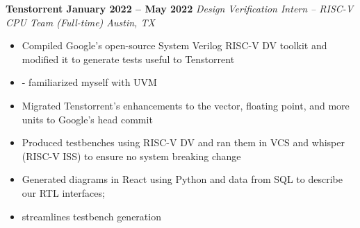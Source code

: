 \documentclass[../main.tex]{subfiles}
\begin{document}
%
\noindent\textbf{{\fontsize{\textFontSize}{\textFontBox}\selectfont Tenstorrent \hfill January 2022 – May 2022}}
\vspace{\jobHeaderDist}\newline
%
{\fontsize{\textFontSize}{\textFontBox}\selectfont\emph{Design Verification Intern – RISC-V CPU Team (Full-time) \hfill Austin, TX \hspace{0 cm}}}\newline
\vspace{\listHeight}
%
%
\begin{itemize}
  \setlength{\itemindent}{-6mm}
  \vspace{\listItemDist}\item {\fontsize{\textFontSize}{\textFontBox}\selectfont Compiled Google’s open-source System Verilog RISC-V DV toolkit and modified it to generate tests useful to Tenstorrent}
  \vspace{\listItemDistTwo}\item {\fontsize{\textFontSize}{\textFontBox}\selectfont - familiarized myself with UVM}
  \vspace{\listItemDistTwo}\item {\fontsize{\textFontSize}{\textFontBox}\selectfont Migrated Tenstorrent’s enhancements to the vector, floating point, and more units to Google’s head commit}
  \vspace{\listItemDistTwo}\item {\fontsize{\textFontSize}{\textFontBox}\selectfont Produced testbenches using RISC-V DV and ran them in VCS and whisper (RISC-V ISS) to ensure no system breaking change}
  \vspace{-9 mm}\item {\fontsize{\textFontSize}{\textFontBox}\selectfont Generated diagrams in React using Python and data from SQL to describe our RTL interfaces;}
  \vspace{\listItemDistTwo}\item {\fontsize{\textFontSize}{\textFontBox}\selectfont streamlines testbench generation}
\end{itemize}
%
%
%
\end{document}

